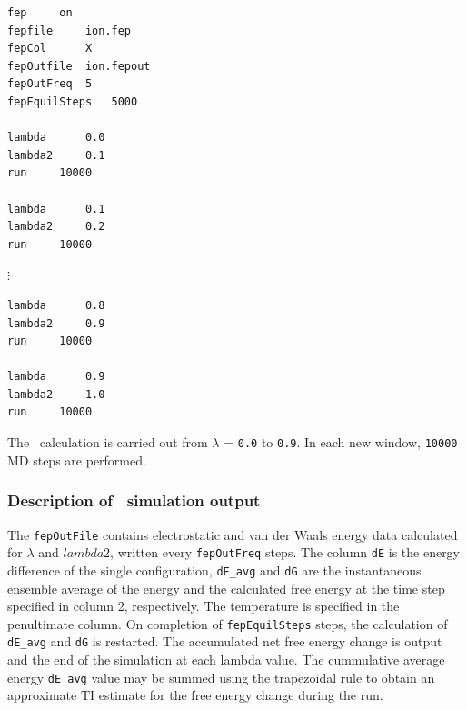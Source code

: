 \begin{verbatim}
fep		on  
fepfile		ion.fep
fepCol		X
fepOutfile	ion.fepout
fepOutFreq	5
fepEquilSteps	5000

lambda		0.0
lambda2		0.1
run		10000

lambda		0.1
lambda2		0.2
run		10000
\end{verbatim}
$\vdots$
\begin{verbatim}
lambda		0.8
lambda2		0.9
run		10000

lambda		0.9
lambda2		1.0
run		10000
\end{verbatim}

The \FEP\ calculation is carried out from $\lambda$ = {\tt 0.0} to
{\tt 0.9}. In each new window, {\tt 10000} MD steps are performed.



\subsubsection{Description of \FEP\ simulation output }

The {\tt fepOutFile} contains electrostatic and van der Waals energy
data calculated for $\lambda$ and $lambda2$, written every
{\tt fepOutFreq} steps. The column {\tt dE} is the energy
difference of the single configuration, {\tt dE\_avg} and {\tt dG}
are the instantaneous ensemble average of the energy and the calculated
free energy at the time step specified in column 2, respectively.
The temperature is specified in the penultimate column. On completion
of {\tt fepEquilSteps} steps, the calculation of {\tt dE\_avg} and 
{\tt dG} is restarted. The accumulated net free energy change is output
and the end of the simulation at each lambda value. The cummulative
average energy {\tt dE\_avg} value may be summed using the 
trapezoidal rule to obtain an approximate TI estimate for the free 
energy change during the run.



